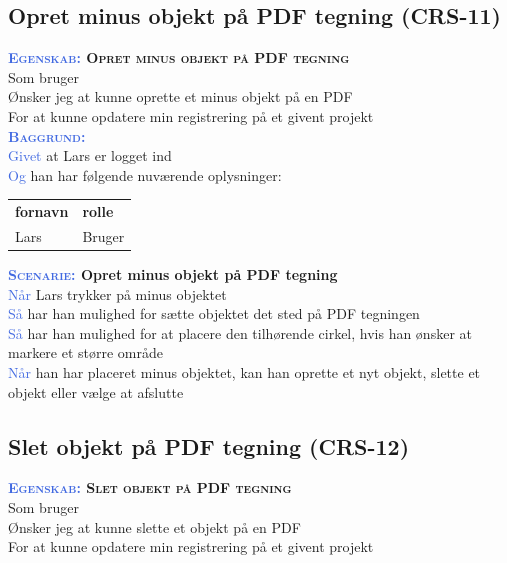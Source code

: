 \clearpage

\subsection{Opret minus objekt på PDF tegning (CRS-11)} \label{sec:USOpretMinusObjekt}
\textbf{\textsc{\textcolor{RoyalBlue}{Egenskab:} Opret minus objekt på PDF tegning}}\\
Som bruger\\
Ønsker jeg at kunne oprette et minus objekt på en PDF\\
For at kunne opdatere min registrering på et givent projekt \\

\textsc{\textcolor{RoyalBlue}{\textbf{Baggrund:}}}\\
\textcolor{RoyalBlue}{Givet} at Lars er logget ind\\
\textcolor{RoyalBlue}{Og} han har følgende nuværende oplysninger:\\
\begin{tabular}{| l | l |}
	\textbf{fornavn} & \textbf{rolle} \\
	Lars & Bruger\\
\end{tabular}

\textbf{\textsc{\textcolor{RoyalBlue}{Scenarie:}} Opret minus objekt på PDF tegning}\\
\textcolor{RoyalBlue}{Når} Lars trykker på minus objektet\\
\textcolor{RoyalBlue}{Så}  har han mulighed for sætte objektet det sted på PDF tegningen \\
\textcolor{RoyalBlue}{Så}  har han mulighed for at placere den tilhørende cirkel, hvis han ønsker at markere et større område\\
\textcolor{RoyalBlue}{Når} han har placeret minus objektet, kan han oprette et nyt objekt, slette et objekt eller vælge at afslutte \\

\subsection{Slet objekt på PDF tegning (CRS-12)} \label{sec:USSletObjekt}
\textbf{\textsc{\textcolor{RoyalBlue}{Egenskab:} Slet objekt på PDF tegning}}\\
Som bruger\\
Ønsker jeg at kunne slette et objekt på en PDF\\
For at kunne opdatere min registrering på et givent projekt \\


